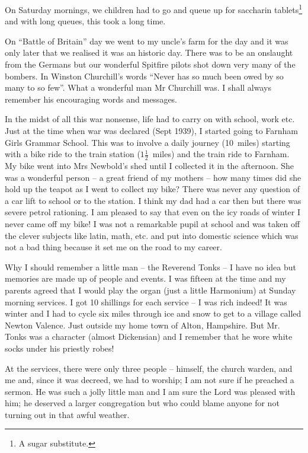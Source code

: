 On Saturday mornings, we children had to go and queue up for saccharin
tablets\footnote{A sugar substitute.} and with long queues, this took
a long time.

On ``Battle of Britain'' day we went to my uncle's farm for the day
and it was only later that we realised it was an historic day. There
was to be an onslaught from the Germans but our wonderful Spitfire
pilots shot down very many of the bombers. In Winston Churchill's
words ``Never has so much been owed by so many to so few''. What a
wonderful man Mr Churchill was. I shall always remember his
encouraging words and messages.

In the midst of all this war nonsense, life had to carry on with
school, work etc. Just at the time when war was declared (Sept 1939),
I started going to Farnham Girls Grammar School. This was to involve a
daily journey (10~miles) starting with a bike ride to the train
station ($1\frac{1}{2}$~miles) and the train ride to Farnham. My bike
went into Mrs Newbold’s shed until I collected it in the
afternoon. She was a wonderful person -- a great friend of my mothers
-- how many times did she hold up the teapot as I went to collect my
bike? There was never any question of a car lift to school or to the
station. I think my dad had a car then but there was severe petrol
rationing. I am pleased to say that even on the icy roads of winter I
never came off my bike! I was not a remarkable pupil at school and was
taken off the clever subjects like latin, math, etc. and put into
domestic science which was not a bad thing because it set me on the
road to my career.

Why I should remember a little man -- the Reverend Tonks -- I have no
idea but memories are made up of people and events. I was fifteen at
the time and my parents agreed that I would play the organ (just a
little Harmonium) at Sunday morning services. I got 10 shillings for
each service -- I was rich indeed! It was winter and I had to cycle
six miles through ice and snow to get to a village called Newton
Valence. Just outside my home town of Alton, Hampshire. But Mr. Tonks
was a character (almost Dickensian) and I remember that he wore white
socks under his priestly robes!

At the services, there were only three people -- himself, the church
warden, and me and, since it was decreed, we had to worship; I am not
sure if he preached a sermon. He was such a jolly little man and I am
sure the Lord was pleased with him; he deserved a larger congregation
but who could blame anyone for not turning out in that awful weather.

